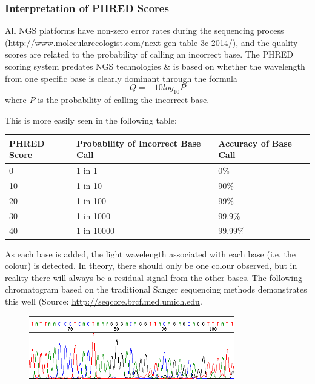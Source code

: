 \subsubsection{Interpretation of PHRED Scores}

\begin{information}
All NGS platforms have non-zero error rates during the sequencing process (\url{http://www.molecularecologist.com/next-gen-table-3c-2014/}), and the quality scores are related to the probability of calling an incorrect base.
The PHRED scoring system predates NGS technologies \& is based on whether the wavelength from one specific base is clearly dominant through the formula
\begin{equation}
  \label{eq:PHRED}
  Q = -10 log_{10} P
\end{equation}
where $P$ is the probability of calling the incorrect base. \\
\end{information}

This is more easily seen in the following table: \\
\begin{center}
\begin{tabular}[h]{|p{3cm} p{5cm} p{3cm}|}
\hline
\textbf{PHRED Score} & \textbf{Probability of Incorrect Base Call} &
\textbf{Accuracy of Base Call} \\
\hline
0 & 1 in 1 & 0\% \\
10 & 1 in 10 & 90\% \\
20 & 1 in 100 & 99\% \\
30 & 1 in 1000 & 99.9\% \\
40 & 1 in 10000 & 99.99\% \\
\hline
\end{tabular}
\end{center}

\begin{note}
As each base is added, the light wavelength associated with each base (i.e. the colour) is detected.
In theory, there should only be one colour observed, but in reality there will always be a residual signal from the other bases.
The following chromatogram based on the traditional Sanger sequencing methods demonstrates this well (Source: \url{http://seqcore.brcf.med.umich.edu}.\\
\end{note}

\begin{figure}[h!]
  \centering
    \includegraphics[width=0.8\textwidth]{clonesite.png}
\end{figure}

